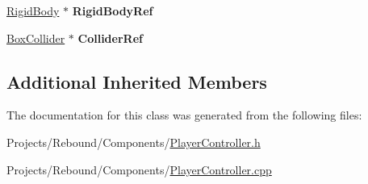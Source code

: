 \begin{DoxyCompactItemize}
\item 
\hypertarget{classDCEngine_1_1Components_1_1PlayerController_a644ec90f56b7edf2c34cd59be2e090b5}{\hyperlink{classDCEngine_1_1Components_1_1RigidBody}{Rigid\-Body} $\ast$ {\bfseries Rigid\-Body\-Ref}}\label{classDCEngine_1_1Components_1_1PlayerController_a644ec90f56b7edf2c34cd59be2e090b5}

\item 
\hypertarget{classDCEngine_1_1Components_1_1PlayerController_a0aed181d17ca20d50631eb3b975f7f91}{\hyperlink{classDCEngine_1_1Components_1_1BoxCollider}{Box\-Collider} $\ast$ {\bfseries Collider\-Ref}}\label{classDCEngine_1_1Components_1_1PlayerController_a0aed181d17ca20d50631eb3b975f7f91}

\end{DoxyCompactItemize}
\subsection*{Additional Inherited Members}


The documentation for this class was generated from the following files\-:\begin{DoxyCompactItemize}
\item 
Projects/\-Rebound/\-Components/\hyperlink{PlayerController_8h}{Player\-Controller.\-h}\item 
Projects/\-Rebound/\-Components/\hyperlink{PlayerController_8cpp}{Player\-Controller.\-cpp}\end{DoxyCompactItemize}
